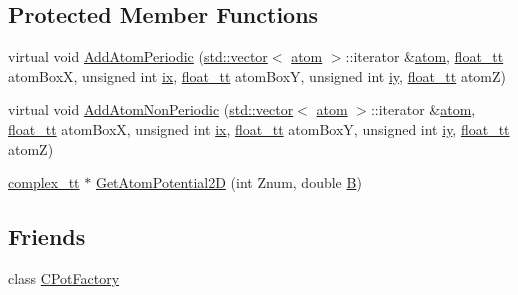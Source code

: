 \subsection*{Protected Member Functions}
\begin{DoxyCompactItemize}
\item 
virtual void \hyperlink{class_q_s_t_e_m_1_1_c2_d_f_f_t_potential_a3fd01ed86cb82807babaa04fd9db43ba}{Add\-Atom\-Periodic} (\hyperlink{qmb_8m_af54b69a32590de218622e869b06b47b3}{std\-::vector}$<$ \hyperlink{namespace_q_s_t_e_m_a402dabc31a7a1fe906d0cdd138c69686}{atom} $>$\-::iterator \&\hyperlink{namespace_q_s_t_e_m_a402dabc31a7a1fe906d0cdd138c69686}{atom}, \hyperlink{namespace_q_s_t_e_m_a915d7caa497280d9f927c4ce8d330e47}{float\-\_\-tt} atom\-Box\-X, unsigned int \hyperlink{_display_model_properties_8m_a76b405b72b88bde9488209ac06ddb714}{ix}, \hyperlink{namespace_q_s_t_e_m_a915d7caa497280d9f927c4ce8d330e47}{float\-\_\-tt} atom\-Box\-Y, unsigned int \hyperlink{_display_model_properties_8m_af4c5cec9fce175f73b7da5ecd33c2af6}{iy}, \hyperlink{namespace_q_s_t_e_m_a915d7caa497280d9f927c4ce8d330e47}{float\-\_\-tt} atom\-Z)
\item 
virtual void \hyperlink{class_q_s_t_e_m_1_1_c2_d_f_f_t_potential_aaa278bbe85dfb6d890232ee71460b32f}{Add\-Atom\-Non\-Periodic} (\hyperlink{qmb_8m_af54b69a32590de218622e869b06b47b3}{std\-::vector}$<$ \hyperlink{namespace_q_s_t_e_m_a402dabc31a7a1fe906d0cdd138c69686}{atom} $>$\-::iterator \&\hyperlink{namespace_q_s_t_e_m_a402dabc31a7a1fe906d0cdd138c69686}{atom}, \hyperlink{namespace_q_s_t_e_m_a915d7caa497280d9f927c4ce8d330e47}{float\-\_\-tt} atom\-Box\-X, unsigned int \hyperlink{_display_model_properties_8m_a76b405b72b88bde9488209ac06ddb714}{ix}, \hyperlink{namespace_q_s_t_e_m_a915d7caa497280d9f927c4ce8d330e47}{float\-\_\-tt} atom\-Box\-Y, unsigned int \hyperlink{_display_model_properties_8m_af4c5cec9fce175f73b7da5ecd33c2af6}{iy}, \hyperlink{namespace_q_s_t_e_m_a915d7caa497280d9f927c4ce8d330e47}{float\-\_\-tt} atom\-Z)
\item 
\hyperlink{namespace_q_s_t_e_m_afa320ea3cd2f5ff080c422f81b803a32}{complex\-\_\-tt} $\ast$ \hyperlink{class_q_s_t_e_m_1_1_c2_d_f_f_t_potential_afd5fedb78c24996ff212ea271827610c}{Get\-Atom\-Potential2\-D} (int Znum, double \hyperlink{xyz2cfg_8m_a422e4e22a48b9ea42c9dfe12b157229d}{B})
\end{DoxyCompactItemize}
\subsection*{Friends}
\begin{DoxyCompactItemize}
\item 
class \hyperlink{class_q_s_t_e_m_1_1_c2_d_f_f_t_potential_a6759f7ccac4d3744ec78fd194903e752}{C\-Pot\-Factory}
\end{DoxyCompactItemize}
